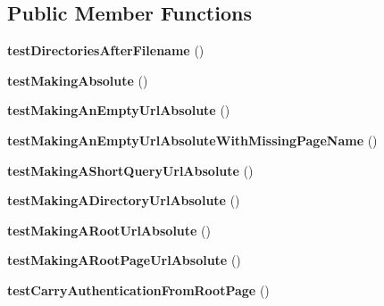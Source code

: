 \subsection*{Public Member Functions}
\begin{DoxyCompactItemize}
\item 
\hypertarget{class_test_of_absolute_urls_aac620a5aaa7f1bc82665be203d9886d7}{
{\bfseries testDirectoriesAfterFilename} ()}
\label{class_test_of_absolute_urls_aac620a5aaa7f1bc82665be203d9886d7}

\item 
\hypertarget{class_test_of_absolute_urls_af10e6101f3739a94670250cd8dc1e7b8}{
{\bfseries testMakingAbsolute} ()}
\label{class_test_of_absolute_urls_af10e6101f3739a94670250cd8dc1e7b8}

\item 
\hypertarget{class_test_of_absolute_urls_ad55d82e4dcb603cca8f0aa3fab1a322b}{
{\bfseries testMakingAnEmptyUrlAbsolute} ()}
\label{class_test_of_absolute_urls_ad55d82e4dcb603cca8f0aa3fab1a322b}

\item 
\hypertarget{class_test_of_absolute_urls_a5276b51fe42f8d0a90e641184b11d5d4}{
{\bfseries testMakingAnEmptyUrlAbsoluteWithMissingPageName} ()}
\label{class_test_of_absolute_urls_a5276b51fe42f8d0a90e641184b11d5d4}

\item 
\hypertarget{class_test_of_absolute_urls_a47a1efcc9de1e69a4cf3ca8f1e04fb6e}{
{\bfseries testMakingAShortQueryUrlAbsolute} ()}
\label{class_test_of_absolute_urls_a47a1efcc9de1e69a4cf3ca8f1e04fb6e}

\item 
\hypertarget{class_test_of_absolute_urls_a166fb6cd8f77213718928801d79a523c}{
{\bfseries testMakingADirectoryUrlAbsolute} ()}
\label{class_test_of_absolute_urls_a166fb6cd8f77213718928801d79a523c}

\item 
\hypertarget{class_test_of_absolute_urls_a9d5be4aaa2041f79a30a1b0140076e88}{
{\bfseries testMakingARootUrlAbsolute} ()}
\label{class_test_of_absolute_urls_a9d5be4aaa2041f79a30a1b0140076e88}

\item 
\hypertarget{class_test_of_absolute_urls_aaa8cc277fe1d61a6365199469b8c0977}{
{\bfseries testMakingARootPageUrlAbsolute} ()}
\label{class_test_of_absolute_urls_aaa8cc277fe1d61a6365199469b8c0977}

\item 
\hypertarget{class_test_of_absolute_urls_a4bd07291c28e3c1f65bc552bb048d12d}{
{\bfseries testCarryAuthenticationFromRootPage} ()}
\label{class_test_of_absolute_urls_a4bd07291c28e3c1f65bc552bb048d12d}


\end{DoxyCompactItemize}
